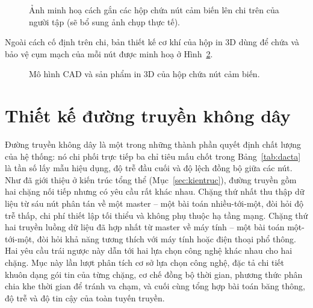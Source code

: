 \documentclass[../DoAn.tex]{subfiles}
\begin{document}
\begin{figure}[h]
    \centering
    \caption{Ảnh minh hoạ cách gắn các hộp chứa nút cảm biến lên chi trên của người tập (sẽ bổ sung ảnh chụp thực tế).}
    \label{fig:armmount}
\end{figure}

Ngoài cách cố định trên chi, bản thiết kế cơ khí của hộp in 3D dùng để chứa và
bảo vệ cụm mạch của mỗi nút được minh hoạ ở Hình~\ref{fig:casecad}.

\begin{figure}[h]
    \centering
    \caption{Mô hình CAD và sản phẩm in 3D của hộp chứa nút cảm biến.}
    \label{fig:casecad}
\end{figure}



\section{Thiết kế đường truyền không dây}
\label{sec:truyenkhongday}

Đường truyền không dây là một trong những thành phần quyết định chất lượng của
hệ thống: nó chi phối trực tiếp ba chỉ tiêu mấu chốt trong Bảng~\ref{tab:dacta}
là tần số lấy mẫu hiệu dụng, độ trễ đầu cuối và độ lệch đồng bộ giữa các nút. Như
đã giới thiệu ở kiến trúc tổng thể (Mục~\ref{sec:kientruc}), đường truyền gồm hai
chặng nối tiếp nhưng có yêu cầu rất khác nhau. Chặng thứ nhất thu thập dữ liệu từ
sáu nút phân tán về một master -- một bài toán nhiều-tới-một, đòi hỏi độ trễ
thấp, chi phí thiết lập tối thiểu và không phụ thuộc hạ tầng mạng. Chặng thứ hai
truyền luồng dữ liệu đã hợp nhất từ master về máy tính -- một bài toán một-tới-một,
đòi hỏi khả năng tương thích với máy tính hoặc điện thoại phổ thông. Hai yêu cầu
trái ngược này dẫn tới hai lựa chọn công nghệ khác nhau cho hai chặng. Mục này
lần lượt phân tích cơ sở lựa chọn công nghệ, đặc tả chi tiết khuôn dạng gói tin
của từng chặng, cơ chế đồng bộ thời gian, phương thức phân chia khe thời gian để
tránh va chạm, và cuối cùng tổng hợp bài toán băng thông, độ trễ và độ tin cậy
của toàn tuyến truyền.
\end{document}
